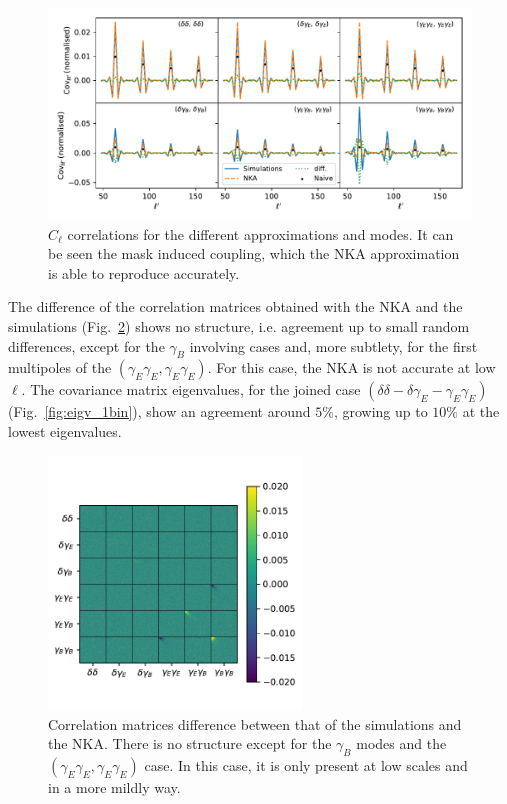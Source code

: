 \documentclass[a4paper,11pt]{article}
\newcommand{\cl}{C_\ell}
\begin{document}
\begin{figure}[htb]
  \centering
  \includegraphics[width=\textwidth]{./figures/all_rows_sph_1bin.pdf}
  \caption{$\cl$ correlations for the different approximations and modes. It
    can be seen the mask induced coupling, which the NKA approximation is able
    to reproduce accurately.}
  \label{fig:rows_1bin}
\end{figure}

The difference of the correlation matrices obtained with the NKA and the
simulations (Fig.~\ref{fig:diff_corr_1bin}) shows no structure, i.e. agreement
up to small random differences, except for the $\gamma_B$ involving cases and,
more subtlety, for the first multipoles of the $(\gamma_E\gamma_E,
\gamma_E\gamma_E)$. For this case, the NKA is not accurate at low $\ell$. 
The covariance matrix eigenvalues, for the joined case
$(\delta\delta-\delta\gamma_E- \gamma_E\gamma_E)$ (Fig.~\ref{fig:eigv_1bin}),
show an agreement around $5\%$, growing up to $10\%$ at the lowest
eigenvalues. 

\begin{figure}[htb]
  \centering
  \includegraphics[width=0.6\textwidth]{./figures/sph_1bin_diff_corr.pdf}
  \caption{Correlation matrices difference between that of the simulations and
    the NKA. There is no structure except for the $\gamma_B$ modes and the
    $(\gamma_E\gamma_E, \gamma_E\gamma_E)$ case. In this case, it is only
    present at low scales and in a more mildly way.} 
  \label{fig:diff_corr_1bin}
\end{figure}
\end{document}

